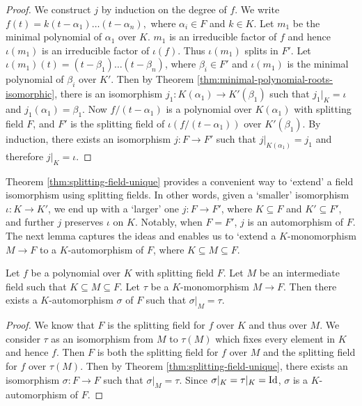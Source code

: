 \begin{proof}
	We construct $j$ by induction on the degree of $f$. We write $ f(t) = k (t - \alpha_1) \ldots (t - \alpha_n), $ where $\alpha_i \in F$ and $k \in K$. Let $m_1$ be the minimal polynomial of $\alpha_1$ over $K$. $m_1$ is an irreducible factor of $f$ and hence $\iota(m_1)$ is an irreducible factor of $\iota(f)$. Thus $\iota(m_1)$ splits in $F'$. Let $\iota(m_1)(t) = (t - \beta_1) \ldots (t - \beta_n)$, where $\beta_i \in F'$ and $\iota(m_1)$ is the minimal polynomial of $\beta_i$ over $K'$. Then by Theorem \ref{thm:minimal-polynomial-roots-isomorphic}, there is an isomorphism $j_1 : K(\alpha_1) \to K'(\beta_1)$ such that $j_1 | _K = \iota$ and $j_1(\alpha_1) = \beta_1$. Now $f / (t - \alpha_1)$ is a polynomial over $K(\alpha_1)$ with splitting field $F$, and $F'$ is the splitting field of $\iota(f / (t - \alpha_1))$ over $K'(\beta_1)$. By induction, there exists an isomorphism $j: F \to F'$ such that $j | _{K(\alpha_1)} = j_1$ and therefore $j | _K = \iota$. 
\end{proof}



Theorem \ref{thm:splitting-field-unique} provides a convenient way to `extend' a field isomorphism using splitting fields. In other words, given a `smaller' isomorphism $\iota: K \to K'$, we end up with a `larger' one $j: F \to F'$, where $K \subseteq F$ and $K' \subseteq F'$, and further $j$ preserves $\iota$ on $K$. Notably, when $F  = F'$, $j$ is an automorphism of $F$. The next lemma captures the ideas and enables us to `extend a $K$-monomorphism $M \to F$ to a $K$-automorphism of $F$, where $K \subseteq M \subseteq F$. 

\begin{lemma} \label{thm:monomorphism-extend-automorphism}
	Let $f$ be a polynomial over $K$ with splitting field $F$. Let $M$ be an intermediate field such that $K \subseteq M \subseteq F$. Let $\tau$ be a $K$-monomorphism $M \to F$. Then there exists a $K$-automorphism $\sigma$ of $F$ such that $\sigma | _M = \tau$.  
\end{lemma}

\begin{proof}
	We know that $F$ is the splitting field for $f$ over $K$ and thus over $M$. We consider $\tau$ as an isomorphism from $M$ to $\tau(M)$ which fixes every element in $K$ and hence $f$. Then $F$ is both the splitting field for $f$ over $M$ and the splitting field for $f$ over $\tau(M)$. Then by Theorem \ref{thm:splitting-field-unique}, there exists an isomorphism $\sigma: F \to F$ such that $\sigma | _M = \tau$. Since $\sigma | _K = \tau |_K = \operatorname{Id}$, $\sigma$ is a $K$-automorphism of $F$. 
\end{proof}

